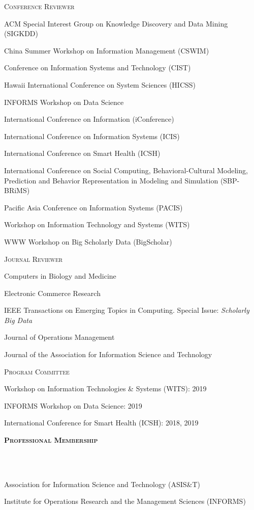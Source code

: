 \documentclass{article}
\newcommand{\header}[1]{{
\hspace*{-15pt}\vspace*{6pt} \textbf{\textsc{\large{#1}}}} \vspace*{-6pt} 
\lineunder
}
\newcommand{\lineunder}{
\vspace*{-8pt} \\ \hspace*{-15pt} 
\hrulefill \\
}
\renewcommand{\labelitemii}{
$\vcenter{\hbox{\tiny$\bullet$}}$\hspace*{-3pt}
}
\newenvironment{bullet-list-major}{
\begin{list}{\labelitemii}{\setlength\leftmargin{3pt} 
\topsep 0pt \itemsep -2pt}}{\vspace*{4pt}\end{list}
}
\begin{document}
\begin{bullet-list-major}
  \item [\hspace{10pt}\textsc{\normalsize{Conference Reviewer}}]
  \item ACM Special Interest Group on Knowledge Discovery and Data Mining (SIGKDD)
    \item China Summer Workshop on Information Management (CSWIM)
  \item Conference on Information Systems and Technology (CIST)
  \item Hawaii International Conference on System Sciences (HICSS)
  \item INFORMS Workshop on Data Science
  \item International Conference on Information (iConference)
  \item International Conference on Information Systems (ICIS)
  \item International Conference on Smart Health (ICSH)
  \item International Conference on Social Computing, Behavioral-Cultural Modeling, Prediction and Behavior Representation in Modeling and Simulation (SBP-BRiMS)
  \item Pacific Asia Conference on Information Systems (PACIS)
  \item Workshop on Information Technology and Systems (WITS)
  \item WWW Workshop on Big Scholarly Data (BigScholar)
\end{bullet-list-major}
\begin{bullet-list-major}
    \item [\hspace{10pt}\textsc{\normalsize{Journal Reviewer}}]
    \item Computers in Biology and Medicine
    \item Electronic Commerce Research
    \item IEEE Transactions on Emerging Topics in Computing. Special Issue: \textit{Scholarly Big Data}
    \item Journal of Operations Management
    \item Journal of the Association for Information Science and Technology
\end{bullet-list-major}
\begin{bullet-list-major}
    \item [\hspace{10pt}\textsc{\normalsize{Program Committee}}]
    \item Workshop on Information Technologies \& Systems (WITS): 2019
    \item INFORMS Workshop on Data Science: 2019
    \item International Conference for Smart Health (ICSH): 2018, 2019
\end{bullet-list-major}

\vspace*{4pt}
\header{Professional Membership}
\begin{bullet-list-major}
\item Association for Information Science and Technology (ASIS\&T)
\item Institute for Operations Research and the Management Sciences (INFORMS)
\end{bullet-list-major}
\end{document}
